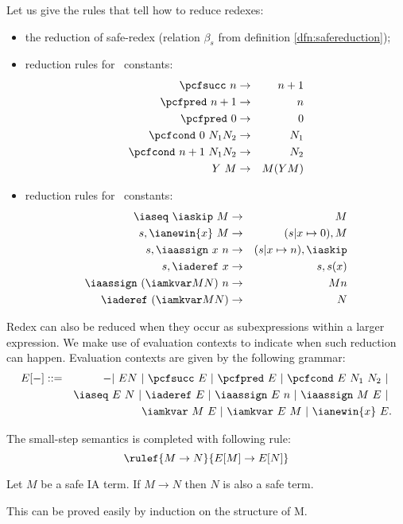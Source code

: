 Let us give the rules that tell how to reduce redexes:
\begin{itemize}
\item the reduction of safe-redex (relation $\beta_s$ from definition \ref{dfn:safereduction});
\item reduction rules for \pcf\ constants:
\begin{eqnarray*}
\pcfsucc\ n &\rightarrow& n+1 \\
\pcfpred\ n+1 &\rightarrow& n \\
\pcfpred\ 0 &\rightarrow& 0 \\
\pcfcond\ 0\ N_1 N_2 &\rightarrow& N_1 \\
\pcfcond\ n+1\ N_1 N_2 &\rightarrow& N_2 \\
Y\ M &\rightarrow& M (Y M)
\end{eqnarray*}
\item reduction rules for \ialgol\ constants:
\begin{eqnarray*}
\iaseq\ \iaskip\  M &\rightarrow& M \\
s, \ianewin{x}\ M &\rightarrow& (s|x\mapsto 0), M \\
s, \iaassign\ x\ n &\rightarrow& (s|x\mapsto n), \iaskip \\
s, \iaderef\ x &\rightarrow& s, s(x) \\
\iaassign\ (\iamkvar M N)\ n &\rightarrow& M n \\
\iaderef\ (\iamkvar M N) &\rightarrow& N
\end{eqnarray*}
\end{itemize}

Redex can also be reduced when they occur as subexpressions within a
larger expression. We make use of evaluation contexts to indicate
when such reduction can happen. Evaluation contexts are given by the
following grammar:
\begin{eqnarray*}
E[-] &::=& - |\ E N\ |\ \pcfsucc\ E\ |\ \pcfpred\ E\ |\ \pcfcond\ E\ N_1\ N_2\ |\ \\
&&    \iaseq\ E\ N\ |\ \iaderef\ E\ |\ \iaassign\ E\ n\ |\ \iaassign\ M\ E \ |\ \\
&&    \iamkvar\ M\ E\ |\ \iamkvar\ E\ M\ |\ \ianewin{x}\ E  .
\end{eqnarray*}

The small-step semantics is completed with following rule:
$$ \rulef{M \rightarrow N}{E[M] \rightarrow E[N]} $$

\begin{lemma}
\label{lem:ia_safety_preserved} Let $M$ be a safe IA term. If
$M \rightarrow N$ then $N$ is also a safe term.
\end{lemma}
This can be proved easily by induction on the structure of M.


